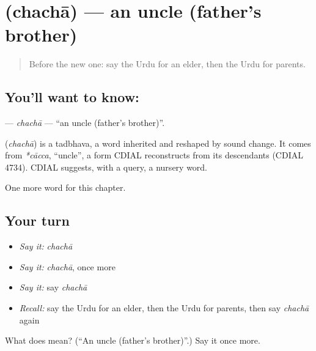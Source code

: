 \section[\texorpdfstring{\ur{چچا} (chachā)}{چچا (chachā)}]{ (chachā) — an uncle (father's brother)}

\label{lesson:UR-C170-chacha}



\begin{quote}
Before the new one: say the Urdu for an elder, then the Urdu for parents.
\end{quote}

\subsection*{You'll want to know: }
\textbf{} — \emph{chachā} — \textquotedblleft{}an uncle (father's brother)\textquotedblright{}.

\begin{cousinweb}
\textbf{} (\emph{chachā}) is a tadbhava, a word inherited and reshaped by sound change. It comes from \emph{*cācca}, \textquotedblleft{}uncle\textquotedblright{}, a form CDIAL reconstructs from its descendants (CDIAL 4734). CDIAL suggests, with a query, a nursery word.
\end{cousinweb}

\begin{grammarlens}[title={What you've built}]
One more word for this chapter.
\end{grammarlens}

\subsection*{Your turn}
\begin{itemize}
\raggedright
  \item \emph{Say it:} \emph{chachā}
  \item \emph{Say it:} \emph{chachā}, once more
  \item \emph{Say it:} say \emph{chachā}
  \item \emph{Recall:} say the Urdu for an elder, then the Urdu for parents, then say \emph{chachā} again
\end{itemize}

\begin{tcolorbox}[breakable,colback=teal!4,colframe=teal!35!black,title={Before you move on}]
What does  mean? (\textquotedblleft{}An uncle (father's brother)\textquotedblright{}.) Say it once more.
\end{tcolorbox}
